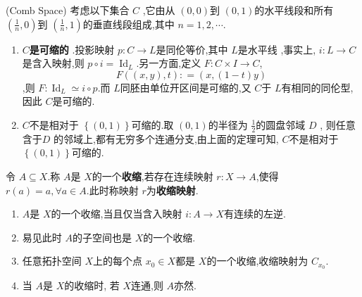 \documentclass[../../几何与拓扑.tex]{subfiles}
\begin{document}
\begin{example}(Comb Space)
    考虑以下集合 \(  C  \) ,它由从 \(  \left( 0,0 \right)   \)到 \(  \left( 0,1 \right)   \)的水平线段和所有 \(  \left( \frac{1}{n},0 \right)   \)到 \(  \left( \frac{1}{n},1 \right)   \)的垂直线段组成,其中 \(  n =  1,2,\cdots   \).     

    \begin{enumerate}
        \item \textbf{\(  C  \)是可缩的  }.投影映射 \(  p: C\to L  \)是同伦等价,其中 \(  L  \)是水平线 ,事实上, 
         \(  i: L \to C  \)是含入映射,则 \(  p\circ i =   \operatorname{Id}_{L} \).另一方面,定义 \(  F: C\times  I \to C  \), \[
         F\left( \left( x,y \right),t  \right) : =  \left( x,\left( 1-t \right)y  \right)   
         \],则 \(  F :\operatorname{Id}_{L}\simeq i\circ p  \).而 \(  L  \)同胚由单位开区间是可缩的,又 \(  C  \)于 \(  L  \)有相同的同伦型,  因此 \(  C  \)是可缩的. 
        \item \(  C  \)不是相对于 \(  \left\{ \left( 0,1 \right)  \right\}  \)可缩的.取 \(  \left( 0,1 \right)   \)的半径为 \(  \frac{1}{2}  \)的圆盘邻域 \( D  \) ,
        则任意含于\(  D  \) 的邻域上,都有无穷多个连通分支,由上面的定理可知, \(  C  \)不是相对于 \(  \left\{ \left( 0,1 \right)  \right\}  \)可缩的.    
    \end{enumerate}
    
\end{example}


\hspace*{\fill} 


\begin{definition}
    令 \(  A\subseteq X  \).称 \(  A  \)是 \(  X  \)的一个\textbf{收缩},若存在连续映射 \(  r: X\to A  \),使得 \(  r\left( a \right)= a,\forall  a \in A   \).此时称映射 \(  r  \)为\textbf{收缩映射}.      
\end{definition}

\begin{remark}
    \begin{enumerate}
        \item  \(  A  \)是 \(  X  \)的一个收缩,当且仅当含入映射 \(  i: A \to X  \)有连续的左逆.
        \item 易见此时 \(  A  \)的子空间也是 \(  X  \)的一个收缩.   
        \item 任意拓扑空间 \(  X  \)上的每个点 \(  x_0 \in X  \)都是 \(  X  \)的一个收缩,收缩映射为 \(  C_{x_0}  \).
        \item 当 \(  A  \)是 \(  X  \)的收缩时,  若 \(  X  \)连通,则 \(  A  \)亦然.            
    \end{enumerate}
    
\end{remark}
\end{document}
